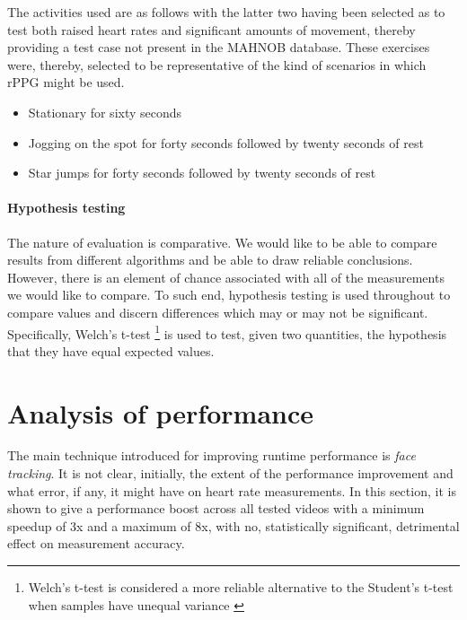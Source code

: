 The activities used are as follows with the latter two having been selected as to test both raised heart rates and significant amounts of movement, thereby providing a test case not present in the MAHNOB database.
These exercises were, thereby, selected to be representative of the kind of scenarios in which rPPG might be used.
\begin{itemize}
   \item Stationary for sixty seconds
   \item Jogging on the spot for forty seconds followed by twenty seconds of rest
   \item Star jumps for forty seconds followed by twenty seconds of rest
\end{itemize}





\paragraph{Hypothesis testing}
The nature of evaluation is comparative. We would like to be able to compare results from different algorithms and be able to draw reliable conclusions. However, there is an element of 
chance associated with all of the measurements we would like to compare.
To such end, hypothesis testing is used throughout to compare values and discern differences which may or may not be significant.
Specifically, Welch's t-test \cite{welch-t-test}\footnote{Welch's t-test is considered a more reliable alternative to the Student's t-test when samples have unequal variance \cite{superior-welch}}
is used to test, given two quantities, the hypothesis that they have equal expected values. 


\section{Analysis of performance}
\label{section:face_tracking}
The main technique introduced for improving runtime performance is \textit{face tracking}. It is not clear, initially, the extent of the performance improvement and what error, if any, it might have 
on heart rate measurements. In this section, it is shown to give a performance boost across all tested videos with a minimum speedup of 3x and a maximum of 8x, with no, statistically significant, detrimental effect on measurement accuracy.

